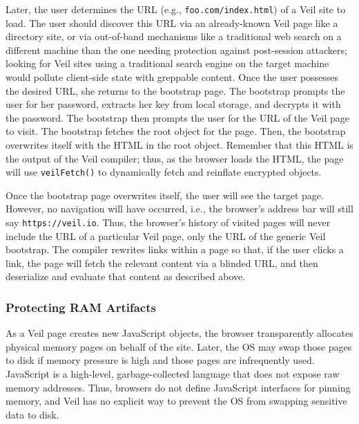Later, the user determines the URL (e.g., \texttt{foo.com/index.html})
of a Veil site to load. The user should discover
this URL via an already-known Veil page like a
directory site, or via out-of-band mechanisms like a
traditional web search on a different machine than the
one needing protection against post-session attackers; looking
for Veil sites using a traditional search engine
on the target machine would pollute client-side state
with greppable content. Once the user possesses the
desired URL, she returns to the bootstrap page. The
bootstrap prompts the user for her password, extracts
her key from local storage, and decrypts it with the
password. The bootstrap then prompts the user for
the URL of the Veil page to visit. The bootstrap
fetches the root object for the page. Then, the
bootstrap overwrites itself with the HTML in the
root object. Remember that this HTML is the output
of the Veil compiler; thus, as the browser loads
the HTML, the page will use \texttt{veilFetch()}
to dynamically fetch and reinflate encrypted objects.

Once the bootstrap page overwrites itself, the user
will see the target page. However, no navigation will
have occurred, i.e., the browser's address bar will
still say \texttt{https://veil.io}. Thus,
the browser's history of visited pages will
never include the URL of a particular Veil page,
only the URL of the generic Veil bootstrap. The
compiler rewrites links within a page so that, if
the user clicks a link, the page will fetch the
relevant content via a blinded URL, and then deserialize
and evaluate that content as described above.

\subsubsection{Protecting RAM Artifacts}
\label{sec:heapWalk}

As a Veil page creates new JavaScript objects,
the browser transparently allocates physical
memory pages on behalf of the site. Later,
the OS may swap those pages to disk if memory
pressure is high and those pages are infrequently
used. JavaScript is a high-level, garbage-collected
language that does not expose raw memory addresses.
Thus, browsers do not define JavaScript interfaces
for pinning memory, and Veil has no explicit way
to prevent the OS from swapping sensitive data
to disk.

